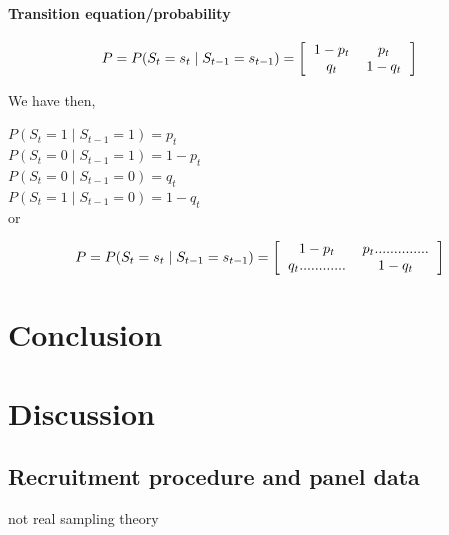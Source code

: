 \documentclass[12pt,a4paper,oneside]{book}
\begin{document}
\subsubsection{Transition equation/probability}

\begin{equation}
    P = P(S_t = s_t \mid S_{t-1} = s_{t-1}) = 
\left[ \begin{tabular}{c c}
            $1 - p_{t}$	& $p_{t}$ \\ 
            $q_{t}$	& $1 - q_{t}$ \\ 
\end{tabular} \right]
\end{equation}

We have then,

$P(S_t = 1 \mid S_{t-1} = 1) = p_t$   \\ 
$P(S_t = 0 \mid S_{t-1} = 1) = 1 - p_t$ \\
$P(S_t = 0 \mid S_{t-1} = 0) = q_t$   \\
$P(S_t = 1 \mid S_{t-1} = 0) = 1- q_t$ \\

or 

\begin{equation}
    P = P(S_t = s_t \mid S_{t-1} = s_{t-1}) = 
\left[ \begin{tabular}{c c}
            $1 - p_{t}$	& $p_{t} ..............$ \\ 
            $q_{t} ............$	& $1 - q_{t}$ \\ 
\end{tabular} \right]
\end{equation}










\chapter{Conclusion}


\chapter{Discussion}

\section*{Recruitment procedure and panel data}
not real sampling theory
\end{document}
